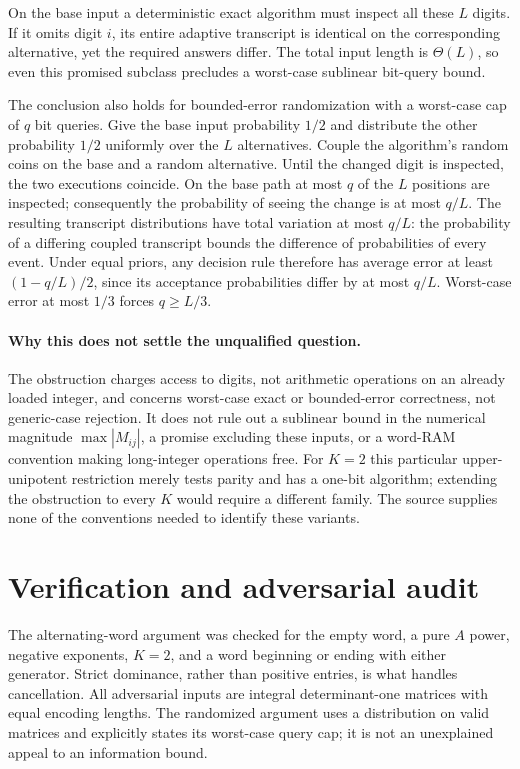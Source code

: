 \documentclass[11pt]{article}
\begin{document}
On the base input a deterministic exact algorithm must inspect all these $L$ digits. If it omits digit $i$, its entire adaptive transcript is identical on the corresponding alternative, yet the required answers differ. The total input length is $\Theta(L)$, so even this promised subclass precludes a worst-case sublinear bit-query bound.

The conclusion also holds for bounded-error randomization with a worst-case cap of $q$ bit queries. Give the base input probability $1/2$ and distribute the other probability $1/2$ uniformly over the $L$ alternatives. Couple the algorithm's random coins on the base and a random alternative. Until the changed digit is inspected, the two executions coincide. On the base path at most $q$ of the $L$ positions are inspected; consequently the probability of seeing the change is at most $q/L$. The resulting transcript distributions have total variation at most $q/L$: the probability of a differing coupled transcript bounds the difference of probabilities of every event. Under equal priors, any decision rule therefore has average error at least $(1-q/L)/2$, since its acceptance probabilities differ by at most $q/L$. Worst-case error at most $1/3$ forces $q\ge L/3$.

\paragraph{Why this does not settle the unqualified question.}
The obstruction charges access to digits, not arithmetic operations on an already loaded integer, and concerns worst-case exact or bounded-error correctness, not generic-case rejection. It does not rule out a sublinear bound in the numerical magnitude $\max |M_{ij}|$, a promise excluding these inputs, or a word-RAM convention making long-integer operations free. For $K=2$ this particular upper-unipotent restriction merely tests parity and has a one-bit algorithm; extending the obstruction to every $K$ would require a different family. The source supplies none of the conventions needed to identify these variants.
\section{Verification and adversarial audit}
The alternating-word argument was checked for the empty word, a pure $A$ power, negative exponents, $K=2$, and a word beginning or ending with either generator. Strict dominance, rather than positive entries, is what handles cancellation. All adversarial inputs are integral determinant-one matrices with equal encoding lengths. The randomized argument uses a distribution on valid matrices and explicitly states its worst-case query cap; it is not an unexplained appeal to an information bound.
\end{document}
